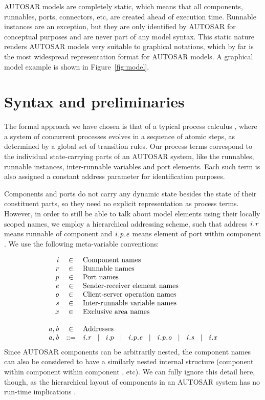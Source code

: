 \documentclass[twocolumn]{article}
\begin{document}
AUTOSAR models are completely static, which means that all components, runnables, ports, connectors, etc, are created ahead of execution time. Runnable instances are an exception, but they are only identified by AUTOSAR for conceptual purposes and are never part of any model syntax. This static nature renders AUTOSAR models very suitable to graphical notations, which by far is the most widespread representation format for AUTOSAR models. A graphical model example is shown in Figure~\ref{fig:model}.


\section{Syntax and preliminaries}
\label{sec:Calc}

The formal approach we have chosen is that of a typical process calculus \cite{TODO}, where a system of concurrent processes evolves in a sequence of atomic steps, as determined by a global set of transition rules. Our process terms correspond to the individual state-carrying parts of an AUTOSAR system, like the runnables, runnable instances, inter-runnable variables and port elements. Each such term is also assigned a constant address parameter for identification purposes.

Components and ports do not carry any dynamic state besides the state of their constituent parts, so they need no explicit representation as process terms. However, in order to still be able to talk about model elements using their locally scoped names, we employ a hierarchical addressing scheme, such that address $\Tr{\V{R}}{\V{I}}$ means runnable  of component  and $\Tep{\V{E}}{\V{P}}{\V{I}}$ means element  of port  within component . We use the following meta-variable conventions:

%
\[
\begin{array}{rcll}
  \V{I} & \in & \text{Component names} \\
  \V{R} & \in & \text{Runnable names} \\
  \V{P} & \in & \text{Port names} \\
  \V{E} & \in & \text{Sender-receiver element names} \\
  \V{O} & \in & \text{Client-server operation names} \\
  \V{S} & \in & \text{Inter-runnable variable names} \\
  \V{X} & \in & \text{Exclusive area names} \\
\\
  \V{A},\V{B} & \in & \text{Addresses} \\
  \V{A},\V{B} & ::= & \Tr{\V{R}}{\V{I}}   \sep   i.p  \sep  \Tep{\V{E}}{\V{P}}{\V{I}}   \sep \Top{\V{O}}{\V{P}}{\V{I}}   \sep   \Ts{\V{S}}{\V{I}}   \sep   \Tx{\V{X}}{\V{I}}   \\
\end{array}
\]
%
Since AUTOSAR components can be arbitrarily nested, the component names  can also be considered to have a similarly nested internal structure (component  within component  within component , etc). We can fully ignore this detail here, though, as the hierarchical layout of components in an AUTOSAR system has no run-time implications \cite{TODO2}.
\end{document}
